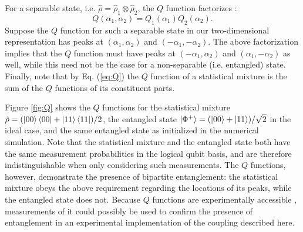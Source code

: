 For a separable state, i.e. $\hat{\rho} = \hat{\rho}_1 \otimes \hat{\rho}_2$, the $Q$ function factorizes \cite{floerchinger_2022}:
\[
    Q(\alpha_1, \alpha_2) = Q_1(\alpha_1) Q_2(\alpha_2).
\]
Suppose the $Q$ function for such a separable state in our two-dimensional representation has peaks at $(\alpha_1, \alpha_2)$ and $(-\alpha_1, -\alpha_2)$.
The above factorization implies that the $Q$ function must have peaks at $(-\alpha_1, \alpha_2)$ and $(\alpha_1, -\alpha_2)$ as well, while this need not be the case for a non-separable (i.e. entangled) state.
Finally, note that by Eq. (\ref{eq:Q}) the $Q$ function of a statistical mixture is the sum of the $Q$ functions of its constituent parts.

Figure \ref{fig:Q} shows the $Q$ functions for the statistical mixture $\hat{\rho} = (\ket{00}\bra{00} + \ket{11}\bra{11}) / 2$, the entangled state $\ket{\Phi^+} = (\ket{00} + \ket{11}) / \sqrt{2}$ in the ideal case, and the same entangled state as initialized in the numerical simulation.
Note that the statistical mixture and the entangled state both have the same measurement probabilities in the logical qubit basis, and are therefore indistinguishable when only considering such measurements.
The $Q$ functions, however, demonstrate the presence of bipartite entanglement: the statistical mixture obeys the above requirement regarding the locations of its peaks, while the entangled state does not.
Because $Q$ functions are experimentally accessible \cite{kirchmair_2013,floerchinger_2022}, measurements of it could possibly be used to confirm the presence of entanglement in an experimental implementation of the coupling described here.

